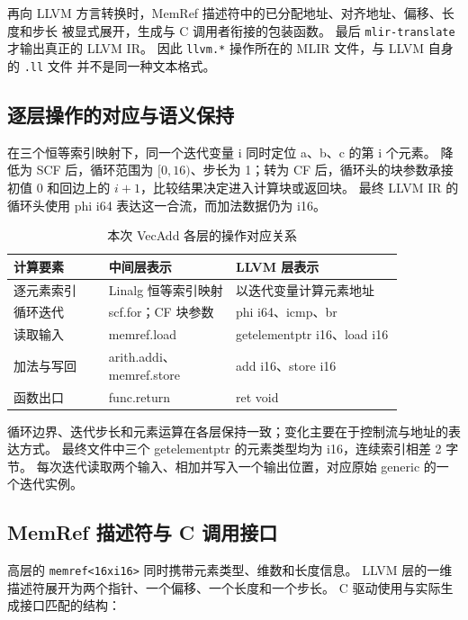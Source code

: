 再向 LLVM 方言转换时，MemRef 描述符中的已分配地址、对齐地址、偏移、长度和步长
被显式展开，生成与 C 调用者衔接的包装函数。
最后 \texttt{mlir-translate} 才输出真正的 LLVM IR。
因此 \texttt{llvm.*} 操作所在的 MLIR 文件，与 LLVM 自身的 \texttt{.ll} 文件
并不是同一种文本格式。

\subsection{逐层操作的对应与语义保持}
在三个恒等索引映射下，同一个迭代变量 i 同时定位 a、b、c 的第 i 个元素。
降低为 SCF 后，循环范围为 $[0,16)$、步长为 1；转为 CF 后，循环头的块参数承接初值 0
和回边上的 $i+1$，比较结果决定进入计算块或返回块。
最终 LLVM IR 的循环头使用 phi i64 表达这一合流，而加法数据仍为 i16。

\begin{table}[htbp]
\centering\small
\caption{本次 VecAdd 各层的操作对应关系}
\begin{tabular}{p{0.21\linewidth}p{0.28\linewidth}p{0.37\linewidth}}
\toprule
计算要素 & 中间层表示 & LLVM 层表示\\
\midrule
逐元素索引 & Linalg 恒等索引映射 & 以迭代变量计算元素地址\\
循环迭代 & scf.for；CF 块参数 & phi i64、icmp、br\\
读取输入 & memref.load & getelementptr i16、load i16\\
加法与写回 & arith.addi、memref.store & add i16、store i16\\
函数出口 & func.return & ret void\\
\bottomrule
\end{tabular}
\end{table}

循环边界、迭代步长和元素运算在各层保持一致；变化主要在于控制流与地址的表达方式。
最终文件中三个 getelementptr 的元素类型均为 i16，连续索引相差 2 字节。
每次迭代读取两个输入、相加并写入一个输出位置，对应原始 generic 的一个迭代实例。

\subsection{MemRef 描述符与 C 调用接口}
高层的 \texttt{memref<16xi16>} 同时携带元素类型、维数和长度信息。
LLVM 层的一维描述符展开为两个指针、一个偏移、一个长度和一个步长。
C 驱动使用与实际生成接口匹配的结构：
\par\vspace{0.7\baselineskip}\noindent\begin{minipage}[t]{\linewidth}

\end{minipage}\par\vspace{0.5\baselineskip}

